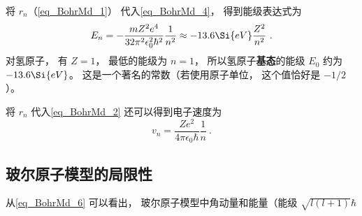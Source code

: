 将 $r_n$（\autoref{eq_BohrMd_1}） 代入\autoref{eq_BohrMd_4}， 得到能级表达式为
\begin{equation}\label{eq_BohrMd_11}
E_n =  - \frac{mZ^2 e^4}{32\pi^2\epsilon_0^2 \hbar ^2} \frac{1}{n^2} \approx  - 13.6\Si{eV}\frac{Z^2}{n^2}~.
\end{equation}
对氢原子， 有 $Z = 1$， 最低的能级为 $n = 1$， 所以氢原子\textbf{基态}的能级 $E_0$ 约为 $-13.6\Si{eV}$。 这是一个著名的常数（若使用原子单位， 这个值恰好是 $-1/2$）。

将 $r_n$ 代入\autoref{eq_BohrMd_2} 还可以得到电子速度为
\begin{equation}\label{eq_BohrMd_10}
v_n = \frac{Z e^2}{4\pi\epsilon_0\hbar} \frac{1}{n}~.
\end{equation}

\subsection{玻尔原子模型的局限性}
从\autoref{eq_BohrMd_6} 可以看出， 玻尔原子模型中角动量和能量（能级 $\sqrt{l(l+1)}\hbar$
